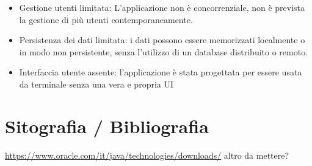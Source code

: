 \documentclass{article}
\begin{document}
\begin{itemize}
    \item Gestione utenti limitata: L’applicazione non è concorrenziale, non è prevista la gestione di più utenti contemporaneamente.
\end{itemize}


\begin{itemize}
    \item Persistenza dei dati limitata: i dati possono essere memorizzati localmente o in modo non persistente, senza l’utilizzo di un database distribuito o remoto.
\end{itemize}

\begin{itemize}
    \item Interfaccia utente assente: l'applicazione è stata progettata per essere usata da terminale senza una vera e propria UI
\end{itemize}


\section{Sitografia / Bibliografia}
\url{https://www.oracle.com/it/java/technologies/downloads/}
altro da mettere?
\end{document}
